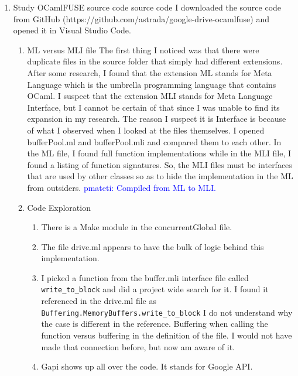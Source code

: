 \documentclass{article}
\newcommand{\PM}[1]{\textcolor{Blue}{pmateti: #1}}%
\begin{document}
\begin{enumerate}

\item Study OCamlFUSE source code %
  source code I downloaded the source code from GitHub
  (https://github.com/astrada/google-drive-ocamlfuse) and opened it in
  Visual Studio Code.
  \begin{enumerate}
  \item ML versus MLI file The first thing I noticed was that there
    were duplicate files in the source folder that simply had
    different extensions. After some research, I found that the
    extension ML stands for Meta Language which is the umbrella
    programming language that contains OCaml. I suspect that the
    extension MLI stands for Meta Language Interface, but I cannot be
    certain of that since I was unable to find its expansion in my
    research. The reason I suspect it is Interface is because of what
    I observed when I looked at the files themselves.  I opened
    bufferPool.ml and bufferPool.mli and compared them to each
    other. In the ML file, I found full function implementations while
    in the MLI file, I found a listing of function signatures. So, the
    MLI files must be interfaces that are used by other classes so as
    to hide the implementation in the ML from outsiders.  \PM{Compiled
      from ML to MLI.}

  \item Code Exploration
    \begin{enumerate}
    \item There is a Make module in the concurrentGlobal file. 
    \item The file drive.ml appears to have the bulk of logic behind
      this implementation.
    \item I picked a function from the buffer.mli interface file
      called \verb|write_to_block| and did a project wide search for
      it. I found it referenced in the drive.ml file as
      \\ \verb|Buffering.MemoryBuffers.write_to_block| I do not
      understand why the case is different in the reference. Buffering
      when calling the function versus buffering in the definition of
      the file. I would not have made that connection before, but now
      am aware of it.
    \item Gapi shows up all over the code. It stands for Google API.
    \end{enumerate}
  \end{enumerate}
\end{enumerate}
\end{document}
